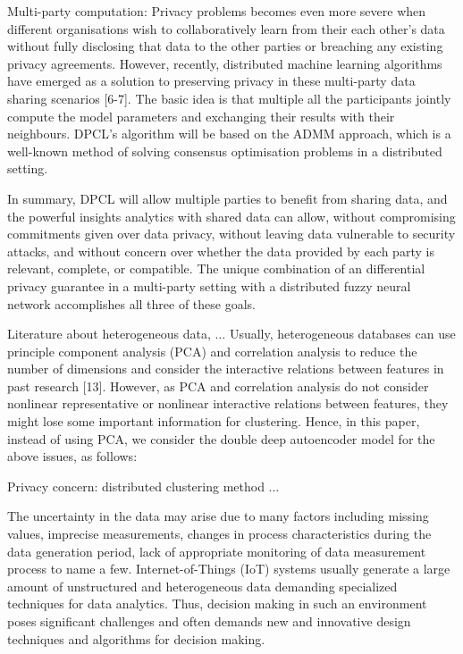 \documentclass[journal,twocolumn,10pt]{IEEEtran}
\begin{document}
Multi-party computation: Privacy problems becomes even more severe when different organisations wish to collaboratively learn from their each other’s data without fully disclosing that data to the other parties or breaching any existing privacy agreements. However, recently, distributed machine learning algorithms have emerged as a solution to preserving privacy in these multi-party data sharing scenarios [6-7]. The basic idea is that multiple all the participants jointly compute the model parameters and exchanging their results with their neighbours. DPCL’s algorithm will be based on the ADMM approach, which is a well-known method of solving consensus optimisation problems in a distributed setting.

In summary, DPCL will allow multiple parties to benefit from sharing data, and the powerful insights analytics with shared data can allow, without compromising commitments given over data privacy, without leaving data vulnerable to security attacks, and without concern over whether the data provided by each party is relevant, complete, or compatible. The unique combination of an differential privacy guarantee in a multi-party setting with a distributed fuzzy neural network accomplishes all three of these goals.

Literature about heterogeneous data, ...  Usually, heterogeneous databases can use principle component analysis (PCA) and correlation analysis to reduce the number of dimensions and consider the interactive relations between features in past research [13]. However, as PCA and correlation analysis do not consider nonlinear representative or nonlinear interactive relations between features, they might lose some important information for clustering. Hence, in this paper, instead of using PCA, we consider the double deep autoencoder model for the above issues, as follows:

Privacy concern: distributed clustering method ...

The uncertainty in the data may arise due to many factors including missing values, imprecise measurements, changes in process characteristics during the data generation period, lack of appropriate monitoring of data measurement process to name a few. Internet-of-Things (IoT) systems usually generate a large amount of unstructured and heterogeneous data demanding specialized techniques for data analytics. Thus, decision making in such an environment poses significant challenges and often demands new and innovative design techniques and algorithms for decision making.
\end{document}
